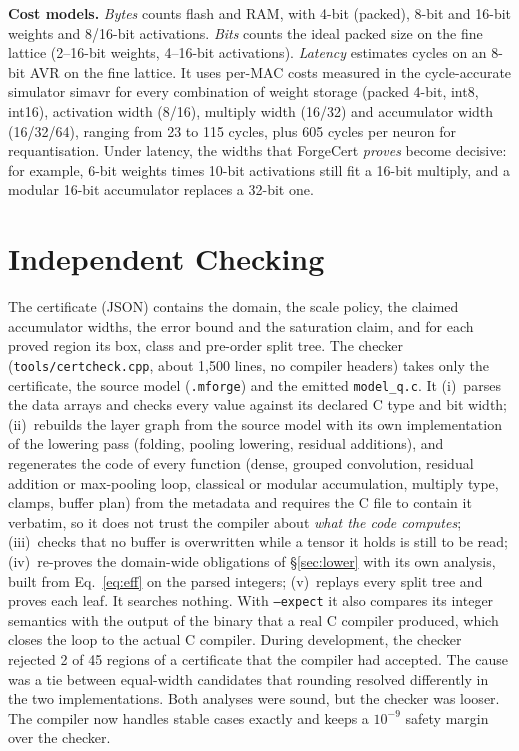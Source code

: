 \textbf{Cost models.} \emph{Bytes} counts flash and RAM, with 4-bit (packed), 8-bit and 16-bit weights and 8/16-bit activations. \emph{Bits} counts the ideal packed size on the fine lattice (2--16-bit weights, 4--16-bit activations). \emph{Latency} estimates cycles on an 8-bit AVR on the fine lattice. It uses per-MAC costs measured in the cycle-accurate simulator simavr for every combination of weight storage (packed 4-bit, int8, int16), activation width (8/16), multiply width (16/32) and accumulator width (16/32/64), ranging from 23 to 115 cycles, plus 605 cycles per neuron for requantisation. Under latency, the widths that ForgeCert \emph{proves} become decisive: for example, 6-bit weights times 10-bit activations still fit a 16-bit multiply, and a modular 16-bit accumulator replaces a 32-bit one.

\section{Independent Checking}\label{sec:check}
The certificate (JSON) contains the domain, the scale policy, the claimed accumulator widths, the error bound and the saturation claim, and for each proved region its box, class and pre-order split tree. The checker (\texttt{tools/certcheck.cpp}, about 1{,}500 lines, no compiler headers) takes only the certificate, the source model (\texttt{.mforge}) and the emitted \texttt{model\_q.c}. It
(i)~parses the data arrays and checks every value against its declared C type and bit width;
(ii)~rebuilds the layer graph from the source model with its own implementation of the lowering pass (folding, pooling lowering, residual additions), and regenerates the code of every function (dense, grouped convolution, residual addition or max-pooling loop, classical or modular accumulation, multiply type, clamps, buffer plan) from the metadata and requires the C file to contain it verbatim, so it does not trust the compiler about \emph{what the code computes};
(iii)~checks that no buffer is overwritten while a tensor it holds is still to be read;
(iv)~re-proves the domain-wide obligations of \S\ref{sec:lower} with its own analysis, built from Eq.~\eqref{eq:eff} on the parsed integers;
(v)~replays every split tree and proves each leaf.
It searches nothing. With \texttt{--expect} it also compares its integer semantics with the output of the binary that a real C compiler produced, which closes the loop to the actual C compiler. During development, the checker rejected 2 of 45 regions of a certificate that the compiler had accepted. The cause was a tie between equal-width candidates that rounding resolved differently in the two implementations. Both analyses were sound, but the checker was looser. The compiler now handles stable cases exactly and keeps a $10^{-9}$ safety margin over the checker.
